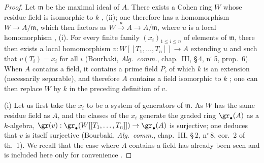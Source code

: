 \begin{proof}
Let $\mathfrak{m}$ be the maximal ideal of $A$.
There exists a Cohen ring $W$ whose residue field is isomorphic to $k$ , (ii); one therefore has a homomorphism $W\to A/\mathfrak{m}$, which then factors as $W\xrightarrow{u}A\to A/\mathfrak{m}$, where $u$ is a local homomorphism , (i).
For every finite family $(x_i)_{1\leq i\leq n}$ of elements of $\mathfrak{m}$, there then exists a local homomorphism $v:W[[T_1,\ldots,T_n]]\to A$ extending $u$ and such that $v(T_i)=x_i$ for all $i$ (Bourbaki, \emph{Alg.\ comm.}, chap.~III, \S\,4, n$^\circ$\,5, prop.~6).
When $A$ contains a field, it contains a prime field $P$, of which $k$ is an extension (necessarily separable), and therefore $A$ contains a field isomorphic to $k$ ; one can then replace $W$ by $k$ in the preceding definition of $v$.

\medskip
\noindent(i)\enspace
Let us first take the $x_i$ to be a system of generators of $\mathfrak{m}$.
As $W$ has the same residue field as $A$, and the classes of the $x_i$ generate the graded ring $\gr_\bullet(A)$ as a $k$-algebra, $\gr(v):\gr_\bullet(W[[T_1,\ldots,T_n]])\to\gr_\bullet(A)$ is surjective; one deduces that $v$ is itself surjective (Bourbaki, \emph{Alg.\ comm.}, chap.~III, \S\,2, n$^\circ$\,8, cor.~2 of th.~1).
We recall that the case where $A$ contains a field has already been seen and is included here only for convenience .


\end{proof}
